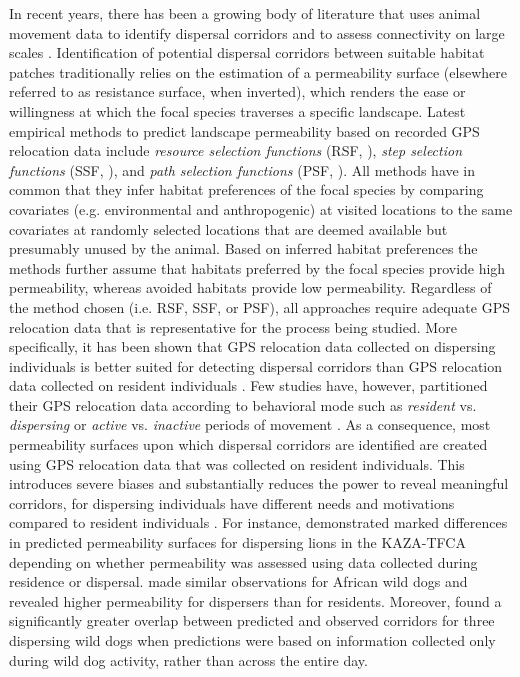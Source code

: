 \documentclass[abstract=on,10pt,a4paper,bibliography=totocnumbered]{scrartcl}
\begin{document}
In recent years, there has been a growing body of literature that uses animal
movement data to identify dispersal corridors and to assess connectivity on
large scales \citep{Chetkiewicz.2006}. Identification of potential dispersal
corridors between suitable habitat patches traditionally relies on the
estimation of a permeability surface (elsewhere referred to as resistance
surface, when inverted), which renders the ease or willingness at which the
focal species traverses a specific landscape. Latest empirical methods to
predict landscape permeability based on recorded GPS relocation data include
\textit{resource selection functions} (RSF, \cite{Boyce.2002}), \textit{step
selection functions} (SSF, \cite{Fortin.2005}), and \textit{path selection
functions} (PSF, \cite{Cushman.2010}). All methods have in common that they
infer habitat preferences of the focal species by comparing covariates (e.g.
environmental and anthropogenic) at visited locations to the same covariates at
randomly selected locations that are deemed available but presumably unused by
the animal. Based on inferred habitat preferences the methods further assume
that habitats preferred by the focal species provide high permeability, whereas
avoided habitats provide low permeability. Regardless of the method chosen (i.e.
RSF, SSF, or PSF), all approaches require adequate GPS relocation data that is
representative for the process being studied. More specifically, it has been
shown that GPS relocation data collected on dispersing individuals is better
suited for detecting dispersal corridors than GPS relocation data collected on
resident individuals \citep{Elliot.2014}. Few studies have, however, partitioned
their GPS relocation data according to behavioral mode such as \textit{resident}
vs. \textit{dispersing} or \textit{active} vs. \textit{inactive} periods of
movement \citep{Wilson.2012, Vasudev.2015}. As a consequence, most permeability
surfaces upon which dispersal corridors are identified are created using GPS
relocation data that was collected on resident individuals. This introduces
severe biases and substantially reduces the power to reveal meaningful
corridors, for dispersing individuals have different needs and motivations
compared to resident individuals \citep{Killeen.2014, Elliot.2014, Cozzi.2020}.
For instance, \cite{Elliot.2014} demonstrated marked differences in predicted
permeability surfaces for dispersing lions in the KAZA-TFCA depending on whether
permeability was assessed using data collected during residence or dispersal.
\cite{Jackson.2016} made similar observations for African wild dogs and revealed
higher permeability for dispersers than for residents. Moreover,
\cite{Abrahms.2017} found a significantly greater overlap between predicted and
observed corridors for three dispersing wild dogs when predictions were based on
information collected only during wild dog activity, rather than across the
entire day.
\end{document}
